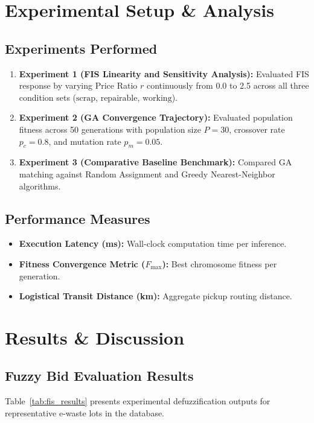 \documentclass[12pt,a4paper]{article}
\begin{document}
\section{Experimental Setup \& Analysis}

\subsection{Experiments Performed}
\begin{enumerate}
    \item \textbf{Experiment 1 (FIS Linearity and Sensitivity Analysis):} Evaluated FIS response by varying Price Ratio $r$ continuously from 0.0 to 2.5 across all three condition sets ($\text{scrap}$, $\text{repairable}$, $\text{working}$).
    \item \textbf{Experiment 2 (GA Convergence Trajectory):} Evaluated population fitness across 50 generations with population size $P=30$, crossover rate $p_c=0.8$, and mutation rate $p_m=0.05$.
    \item \textbf{Experiment 3 (Comparative Baseline Benchmark):} Compared GA matching against Random Assignment and Greedy Nearest-Neighbor algorithms.
\end{enumerate}

\subsection{Performance Measures}
\begin{itemize}
    \item \textbf{Execution Latency (ms):} Wall-clock computation time per inference.
    \item \textbf{Fitness Convergence Metric ($F_{\text{max}}$):} Best chromosome fitness per generation.
    \item \textbf{Logistical Transit Distance (km):} Aggregate pickup routing distance.
\end{itemize}

\section{Results \& Discussion}

\subsection{Fuzzy Bid Evaluation Results}
Table~\ref{tab:fis_results} presents experimental defuzzification outputs for representative e-waste lots in the database.
\end{document}
